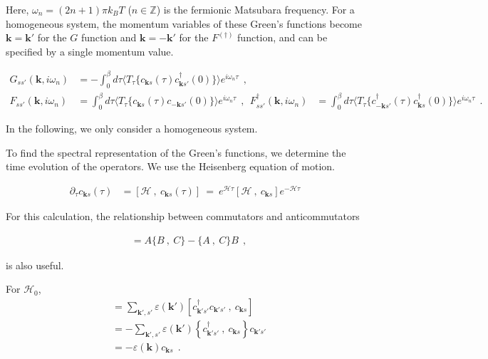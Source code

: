 \documentclass[a4j]{jsarticle}
\begin{document}
Here, $\omega_{n}=(2n+1)\pi k_{B} T$ ($n \in \mathbb{Z}$) is the fermionic Matsubara frequency.
For a homogeneous system, the momentum variables of these Green's functions become $\bm{k}=\bm{k}'$ for the $G$ function and $\bm{k}=-\bm{k}'$ for the $F^{(\dagger)}$ function, and can be specified by a single momentum value.

\begin{align}
	G_{ss'}(\bm{k} , i \omega_{n} )
	 & =
	-
	\int_{0}^{\beta}
	d \tau
	\langle T_{\tau} \{ c_{\bm{k}s}(\tau) c_{\bm{k} s'}^{\dagger}(0) \} \rangle
	e^{i \omega_{n} \tau}
	\ \ ,
	\\[3mm]
	F_{ss'}(\bm{k} , i \omega_{n} )
	 & =
	\int_{0}^{\beta}
	d \tau
	\langle T_{\tau} \{ c_{ \bm{k} s }(\tau) c_{-\bm{k} s' }(0) \} \rangle
	e^{i \omega_{n} \tau}
	\ \ , \ \
	F_{ss'}^{\dagger}(\bm{k} , i \omega_{n} )
	 & =
	\int_{0}^{\beta}
	d \tau
	\langle T_{\tau} \{ c_{ - \bm{k} s' }^{\dagger}(\tau) c_{ \bm{k} s }^{\dagger}(0) \} \rangle
	e^{i \omega_{n} \tau}
	\ \ .
\end{align}

In the following, we only consider a homogeneous system.

To find the spectral representation of the Green's functions, we determine the time evolution of the operators. We use the Heisenberg equation of motion.

\begin{align}
	\partial_{\tau} c_{\bm{k}s} (\tau)
	 & =
	\left[ \mathcal{H} \ , \ c_{\bm{k}s}(\tau) \right]
	\ = \
	e^{\mathcal{H} \tau} \left[ \mathcal{H} \ , \ c_{\bm{k}s} \right] e^{- \mathcal{H} \tau}
\end{align}

For this calculation, the relationship between commutators and anticommutators

\begin{align}
	[AB \ , \ C]
	 & =
	A \{ B \ , \ C \} - \{ A \ , \ C \} B
	\ \ ,
\end{align}

is also useful.

For $\mathcal{H}_{0}$,
\begin{align}
	[ \mathcal{H}_{0} \ , \ c_{\bm{k}s} ]
	 & =
	\sum_{\bm{k}',s'}
	\varepsilon(\bm{k}')
	\left[
		c_{\bm{k}' s'}^{\dagger}
		c_{\bm{k}' s'}
		\ , \
		c_{\bm{k}s}
		\right]
	\nonumber \\[2mm] &=
	-
	\sum_{\bm{k}',s'}
	\varepsilon(\bm{k}')
	\left\{
	c_{\bm{k}' s'}^{\dagger}
	\ , \
	c_{\bm{k}s}
	\right\}
	c_{\bm{k}' s'}
	\nonumber \\[2mm] &=
	-
	\varepsilon( \bm{k} )
	c_{\bm{k} s}
	\ \ .
\end{align}
\end{document}
